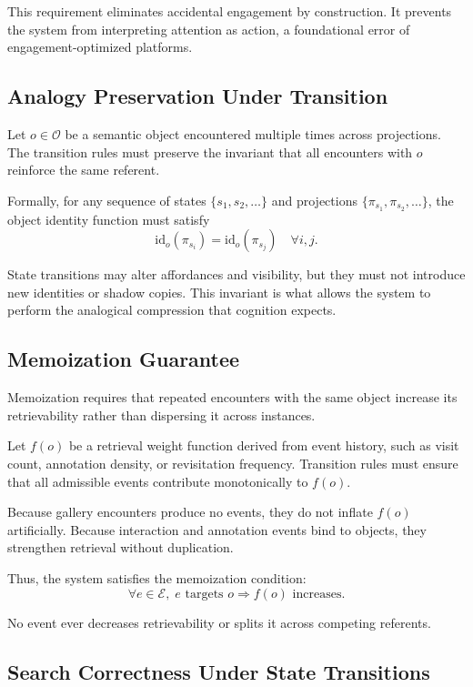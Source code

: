 \documentclass[11pt,oneside]{article}
\begin{document}
This requirement eliminates accidental engagement by construction. It prevents the system from interpreting attention as action, a foundational error of engagement-optimized platforms.

\subsection{Analogy Preservation Under Transition}

Let $o \in \mathcal{O}$ be a semantic object encountered multiple times across projections. The transition rules must preserve the invariant that all encounters with $o$ reinforce the same referent.

Formally, for any sequence of states $\{s_1, s_2, \dots\}$ and projections $\{\pi_{s_1}, \pi_{s_2}, \dots\}$, the object identity function must satisfy
\[
\mathrm{id}_o(\pi_{s_i}) = \mathrm{id}_o(\pi_{s_j}) \quad \forall i, j.
\]

State transitions may alter affordances and visibility, but they must not introduce new identities or shadow copies. This invariant is what allows the system to perform the analogical compression that cognition expects.

\subsection{Memoization Guarantee}

Memoization requires that repeated encounters with the same object increase its retrievability rather than dispersing it across instances.

Let $f(o)$ be a retrieval weight function derived from event history, such as visit count, annotation density, or revisitation frequency. Transition rules must ensure that all admissible events contribute monotonically to $f(o)$.

Because gallery encounters produce no events, they do not inflate $f(o)$ artificially. Because interaction and annotation events bind to objects, they strengthen retrieval without duplication.

Thus, the system satisfies the memoization condition:
\[
\forall e \in \mathcal{E}, \; e \text{ targets } o \Rightarrow f(o) \text{ increases}.
\]

No event ever decreases retrievability or splits it across competing referents.

\subsection{Search Correctness Under State Transitions}
\end{document}
